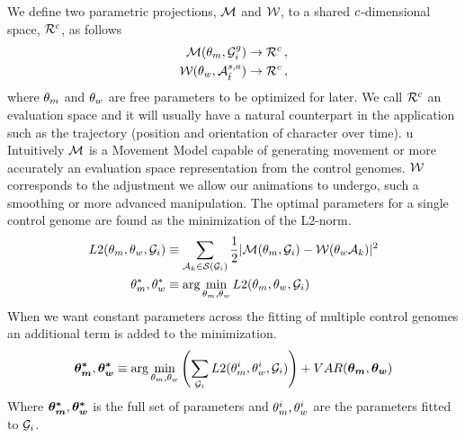We define two parametric projections, $\mathcal{M}$ and $\mathcal{W}$, to a shared $c$-dimensional space, $\mathcal{R}^{c}$, as follows
\begin{align}
\mathcal{M}(\theta_{m},\mathcal{G}_i^{g}) 
&\rightarrow 
\mathcal{R}^{c}    \,,
\\
\mathcal{W}(\theta_{w},\mathcal{A}_{{\hat{t}}}^{s,a})
&\rightarrow
\mathcal{R}^{c} \,,
\end{align}
where $\theta_{m}$ and $\theta_{w}$ are free parameters to be optimized for later. We call $\mathcal{R}^{c}$ an evaluation space and it will usually have a natural counterpart in the application such as the trajectory (position and orientation of character over time).
u
Intuitively $\mathcal{M}$ is a Movement Model capable of generating movement or more accurately an evaluation space representation from the control genomes. $\mathcal{W}$ corresponds to the adjustment we allow our animations to undergo, such a smoothing or more advanced manipulation. The optimal parameters for a single control genome are found as the minimization of the L2-norm.
\begin{subequations}
\begin{align}
    {L2}(\theta_{m},\theta_{w},\mathcal{G}_i)
    &\equiv
    \sum_{\mathcal{A}_k\in\mathcal{S}(\mathcal{G}_i)}
    {
        \frac{1}{2}
        |\mathcal{M}(\theta_{m},\mathcal{G}_i)
        -
        \mathcal{W}(\theta_{w}\mathcal{A}_k)|^2
    }
    \label{eq:optim:single}
    \\
    \theta_{m}^*,\theta_{w}^*
    &\equiv \arg\min_{\theta_{m},\theta_{w}}
    {
        {L2}(\theta_{m},\theta_{w},\mathcal{G}_i)
    }
\end{align}
\end{subequations}
When we want constant parameters across the fitting of multiple control genomes an additional term is added to the minimization. 
\begin{equation}
    \boldsymbol{\theta_{m}^* },\boldsymbol{\theta_{w}^* }
    \equiv 
    \arg\min_{\theta_{m},\theta_{w}}
    \left(
        \sum_{\mathcal{G}_i}
        {L2}(\theta_{m}^i,\theta_{w}^i,\mathcal{G}_i)
    \right)
    +
    VAR(\boldsymbol{\theta_{m} },\boldsymbol{\theta_{w} })
\end{equation}
Where $\boldsymbol{\theta_{m}^* },\boldsymbol{\theta_{w}^* }$ is the full set of parameters and $\theta_{m}^i,\theta_{w}^i$ are the parameters fitted to $\mathcal{G}_i$.


